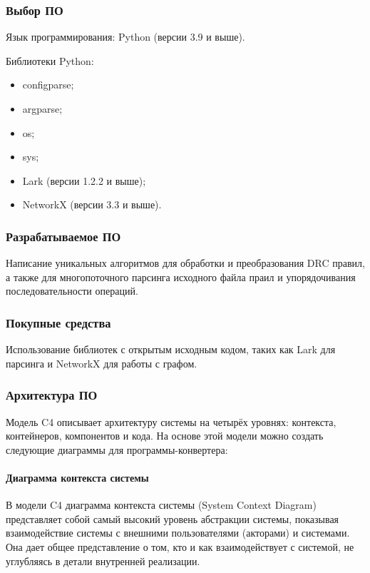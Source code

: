 \subsubsection{Выбор ПО}

Язык программирования: Python (версии 3.9 и выше).

Библиотеки Python:

\begin{itemize}
	\item configparse;
	\item argparse;
	\item os;
	\item sys;
	\item Lark (версии 1.2.2 и выше);
	\item NetworkX (версии 3.3 и выше).
\end{itemize}

\subsubsection{Разрабатываемое ПО}

Написание уникальных алгоритмов для обработки и преобразования DRC правил,
а также для многопоточного парсинга исходного файла праил
и упорядочивания последовательности операций.

\subsubsection{Покупные средства}

Использование библиотек с открытым исходным кодом,
таких как Lark для парсинга и NetworkX для работы с графом.

\subsubsection{Архитектура ПО}

Модель C4 описывает архитектуру системы на четырёх уровнях:
контекста, контейнеров, компонентов и кода.
На основе этой модели можно создать следующие диаграммы
для программы-конвертера:

\paragraph{Диаграмма контекста системы}

В модели C4 диаграмма контекста системы (System Context Diagram)
представляет собой самый высокий уровень абстракции системы,
показывая взаимодействие системы с внешними пользователями (акторами)
и системами. Она дает общее представление о том,
кто и как взаимодействует с системой,
не углубляясь в детали внутренней реализации.
   

